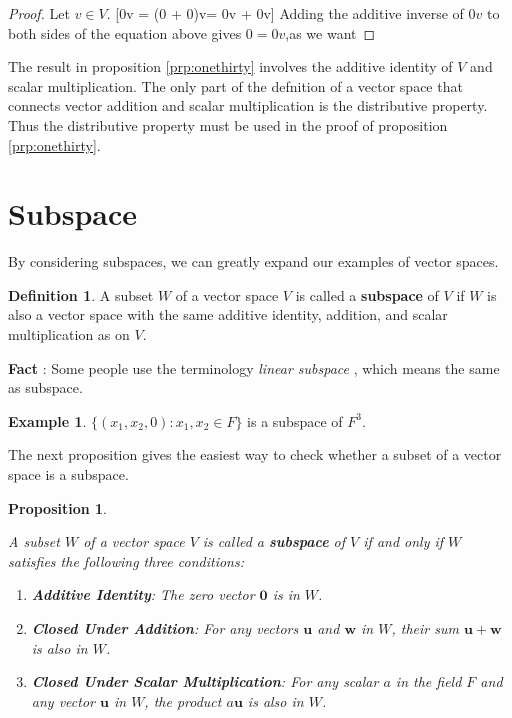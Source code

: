 \documentclass[
]{book}
\providecommand{\tightlist}{%
  \setlength{\itemsep}{0pt}\setlength{\parskip}{0pt}}
\newtheorem{proposition}{Proposition}[chapter]
\theoremstyle{definition}
\newtheorem{definition}{Definition}[chapter]
\theoremstyle{definition}
\newtheorem{example}{Example}[chapter]
\theoremstyle{definition}
\theoremstyle{definition}
\theoremstyle{remark}
\begin{document}
\begin{proof}
Let \(v\in V\).
{[}0v = (0 + 0)v= 0v + 0v{]}
Adding the additive inverse of \(0v\) to both sides of the equation above gives \(0 =0v\),as we want
\end{proof}

The result in proposition \ref{prp:onethirty} involves the additive identity of \(V\) and scalar multiplication.
The only part of the defnition of a vector space that connects vector addition and scalar multiplication is the distributive property. Thus the distributive property must be used in the proof of proposition \ref{prp:onethirty}.

\section{Subspace}\label{subspace}

By considering subspaces, we can greatly expand our examples of vector spaces.

\begin{definition}
\protect\hypertarget{def:unnamed-chunk-33}{}\label{def:unnamed-chunk-33}A subset \(W\) of a vector space \(V\) is called a \textbf{subspace} of \(V\) if \(W\) is also a vector space with the same additive identity, addition, and scalar multiplication as on \(V\).
\end{definition}

\textbf{Fact} : Some people use the terminology \emph{linear subspace} , which means the same as subspace.

\begin{example}
\protect\hypertarget{exm:unnamed-chunk-34}{}\label{exm:unnamed-chunk-34}\(\{(x_1,x_2,0) : x_1,x_2\in  F\}\) is a subspace of \(F^3\).
\end{example}

The next proposition gives the easiest way to check whether a subset of a vector space is a subspace.

\begin{proposition}
\protect\hypertarget{prp:unnamed-chunk-35}{}\label{prp:unnamed-chunk-35}

A subset \(W\) of a vector space \(V\) is called a \textbf{subspace} of \(V\) if and only if \(W\) satisfies the following three conditions:

\begin{enumerate}
\def\labelenumi{\arabic{enumi}.}
\tightlist
\item
  \textbf{Additive Identity}: The zero vector \(\mathbf{0}\) is in \(W\).
\item
  \textbf{Closed Under Addition}: For any vectors \(\mathbf{u}\) and \(\mathbf{w}\) in \(W\), their sum \(\mathbf{u} + \mathbf{w}\) is also in \(W\).
\item
  \textbf{Closed Under Scalar Multiplication}: For any scalar \(a\) in the field \(F\) and any vector \(\mathbf{u}\) in \(W\), the product \(a\mathbf{u}\) is also in \(W\).
\end{enumerate}

\end{proposition}
\end{document}
